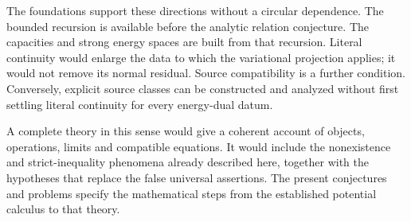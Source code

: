 \documentclass[11pt,a4paper]{article}
\theoremstyle{definition}
\theoremstyle{remark}
\numberwithin{equation}{section}
\begin{document}
The foundations support these directions without a circular dependence.
The bounded recursion is available before the analytic relation
conjecture.  The capacities and strong energy spaces are built from
that recursion.  Literal continuity would enlarge the data to which
the variational projection applies; it would not remove its normal
residual.  Source compatibility is a further condition.  Conversely,
explicit source classes can be constructed and analyzed without first
settling literal continuity for every energy-dual datum.

A complete theory in this sense would give a coherent account of
objects, operations, limits and compatible equations.  It would
include the nonexistence and strict-inequality phenomena already
described here, together with the hypotheses that replace the false
universal assertions.  The present conjectures and problems specify
the mathematical steps from the established potential calculus to
that theory.
\end{document}
